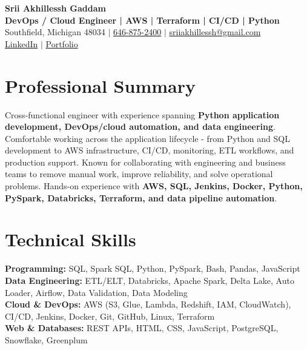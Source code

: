 \documentclass[letterpaper,10pt]{article}
\begin{document}
\fontsize{9.35pt}{10.45pt}\selectfont

\begin{center}
    {\LARGE \textbf{Srii Akhillessh Gaddam}} \\[-1pt]
    \textbf{DevOps / Cloud Engineer | AWS | Terraform | CI/CD | Python} \\[2pt]
    Southfield, Michigan 48034 $|$
    \href{tel:6468752400}{646-875-2400} $|$
    \href{mailto:sriiakhillessh@gmail.com}{sriiakhillessh@gmail.com} \\[1pt]
    \href{https://www.linkedin.com/in/srii-akhiilessh-gaddam-b48668191/}{LinkedIn} $|$
    \href{https://sriiakhillesshg.github.io/portfolio/}{Portfolio}
\end{center}
\vspace{-8pt}

\section{Professional Summary}
\small{Cross-functional engineer with experience spanning \textbf{Python application development, DevOps/cloud automation, and data engineering}. Comfortable working across the application lifecycle - from Python and SQL development to AWS infrastructure, CI/CD, monitoring, ETL workflows, and production support. Known for collaborating with engineering and business teams to remove manual work, improve reliability, and solve operational problems. Hands-on experience with \textbf{AWS, SQL, Jenkins, Docker, Python, PySpark, Databricks, Terraform, and data pipeline automation}.}

\section{Technical Skills}
\small{
\textbf{Programming:} SQL, Spark SQL, Python, PySpark, Bash, Pandas, JavaScript \\
\textbf{Data Engineering:} ETL/ELT, Databricks, Apache Spark, Delta Lake, Auto Loader, Airflow, Data Validation, Data Modeling \\
\textbf{Cloud \& DevOps:} AWS (S3, Glue, Lambda, Redshift, IAM, CloudWatch), CI/CD, Jenkins, Docker, Git, GitHub, Linux, Terraform \\
\textbf{Web \& Databases:} REST APIs, HTML, CSS, JavaScript, PostgreSQL, Snowflake, Greenplum
}
\end{document}
